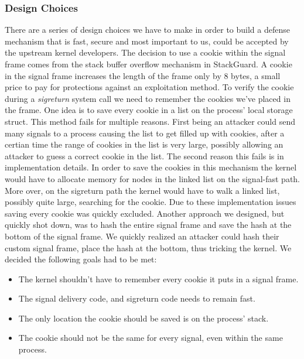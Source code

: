 \documentclass{sig-alternate-05-2015}
\begin{document}
\subsubsection{Design Choices}
There are a series of design choices we have to make in order to build a defense mechanism that is fast, secure and most important to us, could be accepted by the upstream kernel developers. The decision to use a cookie within the signal frame comes from the stack buffer overflow mechanism in StackGuard. A cookie in the signal frame increases the length of the frame only by 8 bytes, a small price to pay for protections against an exploitation method. To verify the cookie during a \textit{sigreturn} system call we need to remember the cookies we've placed in the frame. One idea is to save every cookie in a list on the process' local storage struct. This method fails for multiple reasons. First being an attacker could send many signals to a process causing the list to get filled up with cookies, after a certian time the range of cookies in the list is very large, possibly allowing an attacker to guess a correct cookie in the list. The second reason this fails is in implementation details. In order to save the cookies in this mechanism the kernel would have to allocate memory for nodes in the linked list on the signal-fast path. More over, on the sigreturn path the kernel would have to walk a linked list, possibly quite large, searching for the cookie. Due to these implementation issues saving every cookie was quickly excluded. Another approach we designed, but quickly shot down, was to hash the entire signal frame and save the hash at the bottom of the signal frame. We quickly realized an attacker could hash their custom signal frame, place the hash at the bottom, thus tricking the kernel. We decided the following goals had to be met:\\
\begin{itemize}
  \item The kernel shouldn't have to remember every cookie it puts in a signal frame.
  \item The signal delivery code, and sigreturn code needs to remain fast.
  \item The only location the cookie should be saved is on the process' stack.
  \item The cookie should not be the same for every signal, even within the same process.
\end{itemize}
\end{document}

